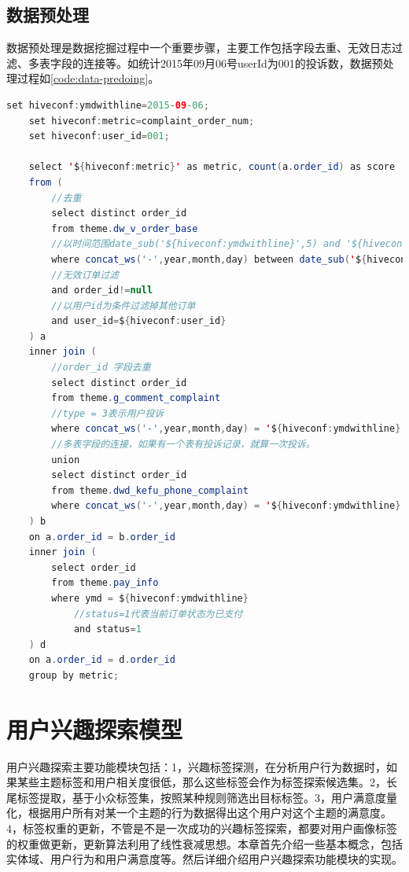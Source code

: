   \subsection{数据预处理}
  数据预处理是数据挖掘过程中一个重要步骤，主要工作包括字段去重、无效日志过滤、多表字段的连接等。如统计2015年09月06号userId为001的投诉数，数据预处理过程如\autoref{code:data-predoing}。
  \begin{lstlisting}[language=java,firstnumber=1,label={code:data-predoing}, caption={数据预处理脚本}]
    set hiveconf:ymdwithline=2015-09-06;
    set hiveconf:metric=complaint_order_num;
    set hiveconf:user_id=001;

    select '${hiveconf:metric}' as metric, count(a.order_id) as score
    from (
        //去重
        select distinct order_id
        from theme.dw_v_order_base
        //以时间范围date_sub('${hiveconf:ymdwithline}',5) and '${hiveconf:ymdwithline}'为条件过滤掉不符合条件的订单
        where concat_ws('-',year,month,day) between date_sub('${hiveconf:ymdwithline}',5) and '${hiveconf:ymdwithline}'
        //无效订单过滤
        and order_id!=null
        //以用户id为条件过滤掉其他订单
        and user_id=${hiveconf:user_id}
    ) a
    inner join (
        //order_id 字段去重
        select distinct order_id
        from theme.g_comment_complaint
        //type = 3表示用户投诉
        where concat_ws('-',year,month,day) = '${hiveconf:ymdwithline}' and type = 3
        //多表字段的连接，如果有一个表有投诉记录，就算一次投诉。
        union
        select distinct order_id
        from theme.dwd_kefu_phone_complaint
        where concat_ws('-',year,month,day) = '${hiveconf:ymdwithline}'
    ) b
    on a.order_id = b.order_id
    inner join (
        select order_id
        from theme.pay_info
        where ymd = ${hiveconf:ymdwithline}
            //status=1代表当前订单状态为已支付
            and status=1
    ) d
    on a.order_id = d.order_id
    group by metric;
  \end{lstlisting}

\section{用户兴趣探索模型}
用户兴趣探索主要功能模块包括：1，兴趣标签探测，在分析用户行为数据时，如果某些主题标签和用户相关度很低，那么这些标签会作为标签探索候选集。2，长尾标签提取，基于小众标签集，按照某种规则筛选出目标标签。3，用户满意度量化，根据用户所有对某一个主题的行为数据得出这个用户对这个主题的满意度。4，标签权重的更新，不管是不是一次成功的兴趣标签探索，都要对用户画像标签的权重做更新，更新算法利用了线性衰减思想。本章首先介绍一些基本概念，包括实体域、用户行为和用户满意度等。然后详细介绍用户兴趣探索功能模块的实现。
